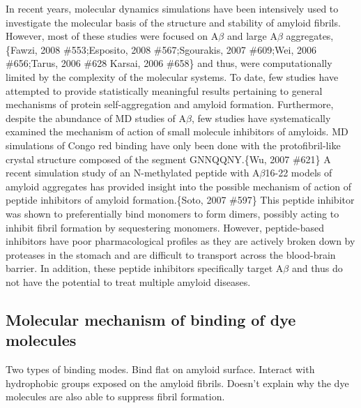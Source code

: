 \begin{outline}
	\1 In recent years, molecular dynamics simulations have been intensively used to investigate the molecular basis of the structure and stability of amyloid fibrils. However, most of these studies were focused on A$\beta$ and large A$\beta$ aggregates,\{Fawzi, 2008 \#553;Esposito, 2008 \#567;Sgourakis, 2007 \#609;Wei, 2006 \#656;Tarus, 2006 \#628 Karsai, 2006 \#658\} and thus, were computationally limited by the complexity of the molecular systems. To date, few studies have attempted to provide statistically meaningful results pertaining to general mechanisms of protein self-aggregation and amyloid formation. Furthermore, despite the abundance of MD studies of A$\beta$, few studies have systematically examined the mechanism of action of small molecule inhibitors of amyloids. MD simulations of Congo red binding have only been done with the protofibril-like crystal structure composed of the segment GNNQQNY.\{Wu, 2007 \#621\} A recent simulation study of an N-methylated peptide with A$\beta$16-22 models of amyloid aggregates has provided insight into the possible mechanism of action of peptide inhibitors of amyloid formation.\{Soto, 2007 \#597\} This peptide inhibitor was shown to preferentially bind monomers to form dimers, possibly acting to inhibit fibril formation by sequestering monomers. However, peptide-based inhibitors have poor pharmacological profiles as they are actively broken down by proteases in the stomach and are difficult to transport across the blood-brain barrier. In addition, these peptide inhibitors specifically target A$\beta$ and thus do not have the potential to treat multiple amyloid diseases.
\end{outline}

\subsection{Molecular mechanism of binding of dye molecules}
Two types of binding modes. Bind flat on amyloid surface. Interact with hydrophobic groups exposed on the amyloid fibrils.
Doesn't explain why the dye molecules are also able to suppress fibril formation.



